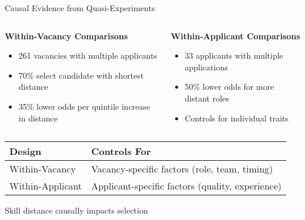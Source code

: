 \documentclass{beamer}
\begin{document}
\begin{frame}{Causal Evidence from Quasi-Experiments}
\begin{columns}
\begin{column}{0.48\textwidth}
\begin{tcolorbox}[colback=boxbackground,colframe=boxframe,sharp corners]
\textbf{Within-Vacancy Comparisons}
\begin{itemize}
    \item 261 vacancies with multiple applicants
    \item 70\% select candidate with shortest distance
    \item 35\% lower odds per quintile increase in distance
\end{itemize}
\end{tcolorbox}
\end{column}
\begin{column}{0.48\textwidth}
\begin{tcolorbox}[colback=boxbackground,colframe=boxframe,sharp corners]
\textbf{Within-Applicant Comparisons}
\begin{itemize}
    \item 33 applicants with multiple applications
    \item 50\% lower odds for more distant roles
    \item Controls for individual traits
\end{itemize}
\end{tcolorbox}
\end{column}
\end{columns}

\vspace{0.3cm}
\begin{table}
\centering
\begin{tabular}{l l}
\toprule
\textbf{Design} & \textbf{Controls For} \\
\midrule
Within-Vacancy & Vacancy-specific factors (role, team, timing) \\
Within-Applicant & Applicant-specific factors (quality, experience) \\
\bottomrule
\end{tabular}
\end{table}

\vspace{0.2cm}
\begin{center}
\large Skill distance causally impacts selection
\end{center}
\end{frame}
\end{document}
